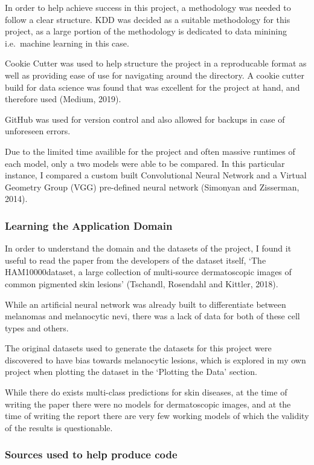 \documentclass[11pt]{article}
\begin{document}
In order to help achieve success in this project, a methodology was
needed to follow a clear structure. KDD was decided as a suitable
methodology for this project, as a large portion of the methodology is
dedicated to data minining i.e.~machine learning in this case.

Cookie Cutter was used to help structure the project in a reproducable
format as well as providing ease of use for navigating around the
directory. A cookie cutter build for data science was found that was
excellent for the project at hand, and therefore used (Medium, 2019).

GitHub was used for version control and also allowed for backups in case
of unforeseen errors.

Due to the limited time availible for the project and often massive
runtimes of each model, only a two models were able to be compared. In
this particular instance, I compared a custom built Convolutional Neural
Network and a Virtual Geometry Group (VGG) pre-defined neural network
(Simonyan and Zisserman, 2014).

    \hypertarget{learning-the-application-domain}{%
\subsubsection{Learning the Application
Domain}\label{learning-the-application-domain}}

In order to understand the domain and the datasets of the project, I
found it useful to read the paper from the developers of the dataset
itself, `The HAM10000dataset, a large collection of multi-source
dermatoscopic images of common pigmented skin lesions' (Tschandl,
Rosendahl and Kittler, 2018).

While an artificial neural network was already built to differentiate
between melanomas and melanocytic nevi, there was a lack of data for
both of these cell types and others.

The original datasets used to generate the datasets for this project
were discovered to have bias towards melanocytic lesions, which is
explored in my own project when plotting the dataset in the `Plotting
the Data' section.

While there do exists multi-class predictions for skin diseases, at the
time of writing the paper there were no models for dermatoscopic images,
and at the time of writing the report there are very few working models
of which the validity of the results is questionable.

    \hypertarget{sources-used-to-help-produce-code}{%
\subsubsection{Sources used to help produce
code}\label{sources-used-to-help-produce-code}}
\end{document}
